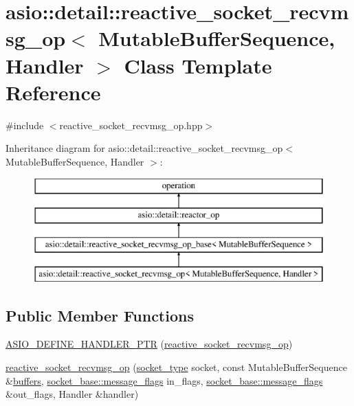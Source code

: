\hypertarget{classasio_1_1detail_1_1reactive__socket__recvmsg__op}{}\section{asio\+:\+:detail\+:\+:reactive\+\_\+socket\+\_\+recvmsg\+\_\+op$<$ Mutable\+Buffer\+Sequence, Handler $>$ Class Template Reference}
\label{classasio_1_1detail_1_1reactive__socket__recvmsg__op}


{\ttfamily \#include $<$reactive\+\_\+socket\+\_\+recvmsg\+\_\+op.\+hpp$>$}

Inheritance diagram for asio\+:\+:detail\+:\+:reactive\+\_\+socket\+\_\+recvmsg\+\_\+op$<$ Mutable\+Buffer\+Sequence, Handler $>$\+:\begin{figure}[H]
\begin{center}
\leavevmode
\includegraphics[height=4.000000cm]{classasio_1_1detail_1_1reactive__socket__recvmsg__op}
\end{center}
\end{figure}
\subsection*{Public Member Functions}
\begin{DoxyCompactItemize}
\item 
\hyperlink{classasio_1_1detail_1_1reactive__socket__recvmsg__op_a4b956d4650176bbfa199ce37a9b73d22}{A\+S\+I\+O\+\_\+\+D\+E\+F\+I\+N\+E\+\_\+\+H\+A\+N\+D\+L\+E\+R\+\_\+\+P\+T\+R} (\hyperlink{classasio_1_1detail_1_1reactive__socket__recvmsg__op}{reactive\+\_\+socket\+\_\+recvmsg\+\_\+op})
\item 
\hyperlink{classasio_1_1detail_1_1reactive__socket__recvmsg__op_a7aa8dcf508b34cd6521c7cf188f39884}{reactive\+\_\+socket\+\_\+recvmsg\+\_\+op} (\hyperlink{namespaceasio_1_1detail_a6798c771dd84b79798b1a08150706ea9}{socket\+\_\+type} socket, const Mutable\+Buffer\+Sequence \&\hyperlink{group__async__read_ga54dede45c3175148a77fe6635222c47d}{buffers}, \hyperlink{classasio_1_1socket__base_ac3cf77465dfedfe1979b5415cf32cc94}{socket\+\_\+base\+::message\+\_\+flags} in\+\_\+flags, \hyperlink{classasio_1_1socket__base_ac3cf77465dfedfe1979b5415cf32cc94}{socket\+\_\+base\+::message\+\_\+flags} \&out\+\_\+flags, Handler \&handler)
\end{DoxyCompactItemize}
